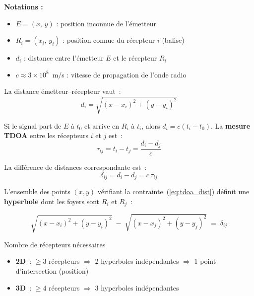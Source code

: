 \documentclass[12pt, a4paper]{article}
\begin{document}
\noindent\textbf{Notations :}
\begin{itemize}
  \item $E = (x,\, y)$ : position inconnue de l'émetteur
  \item $R_i = (x_i,\, y_i)$ : position connue du récepteur $i$ (balise)
  \item $d_i$ : distance entre l'émetteur $E$ et le récepteur $R_i$
  \item $c \approx 3\times10^8$~m/s : vitesse de propagation de l'onde radio
\end{itemize}

La distance émetteur–récepteur vaut~:
\begin{equation}
  d_i = \sqrt{(x - x_i)^2 + (y - y_i)^2}
  \label{eq:dist}
\end{equation}

Si le signal part de $E$ à $t_0$ et arrive en $R_i$ à $t_i$, alors $d_i = c(t_i - t_0)$.
La \textbf{mesure TDOA} entre les récepteurs $i$ et $j$ est~:
\begin{equation}
  \tau_{ij} = t_i - t_j = \frac{d_i - d_j}{c}
  \label{eq:tdoa_time}
\end{equation}

La différence de distances correspondante est~:
\begin{equation}
  \delta_{ij} = d_i - d_j = c\,\tau_{ij}
  \label{eq:tdoa_dist}
\end{equation}

L'ensemble des points $(x,y)$ vérifiant la contrainte~(\ref{eq:tdoa_dist}) définit
une \textbf{hyperbole} dont les foyers sont $R_i$ et $R_j$~:

\begin{keybox}
\begin{equation}
  \sqrt{(x - x_i)^2 + (y - y_i)^2} \;-\; \sqrt{(x - x_j)^2 + (y - y_j)^2} \;=\; \delta_{ij}
  \label{eq:hyperbole}
\end{equation}
\end{keybox}

\begin{summarybox}{Nombre de récepteurs nécessaires}
\begin{itemize}
  \item \textbf{2D}~: $\geq 3$ récepteurs $\Rightarrow$ 2 hyperboles indépendantes
        $\Rightarrow$ 1 point d'intersection (position)
  \item \textbf{3D}~: $\geq 4$ récepteurs $\Rightarrow$ 3 hyperboles indépendantes
\end{itemize}
\end{summarybox}
\end{document}
